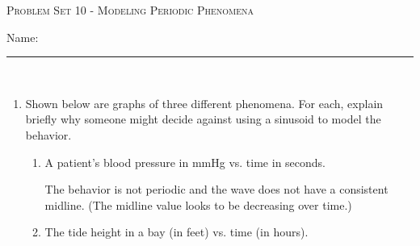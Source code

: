 \documentclass{article}
\begin{document}
\begin{center}
  \large\textsc{Problem Set 10 - Modeling Periodic Phenomena}
  
      \pspace{12pt}
  \begin{problemonly}\large Name: \rule{5cm}{0.15mm}\\ \end{problemonly}
\end{center}

\begin{enumerate}

\item
Shown below are graphs of three different phenomena. For each, explain briefly why someone might decide against using a sinusoid to model the behavior.

\begin{enumerate}

\item 
    \begin{problem}
        A patient's blood pressure in mmHg vs. time in seconds.
    \begin{center}
    \end{center}
    \end{problem}
    \pspace{\vfill}

\begin{solution}
    The behavior is not periodic and the wave does not have a consistent midline. (The midline value looks to be decreasing over time.)
\end{solution}

    \item 
    \begin{problem}
        The tide height in a bay (in feet) vs. time (in hours).
    \begin{center}
    \end{center}
    \end{problem}
    \pspace{\vfill}


\end{enumerate}
\end{enumerate}
\end{document}
